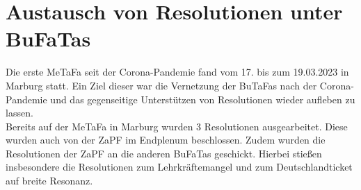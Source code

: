 \documentclass{scrartcl}
\begin{document}
\section*{Austausch von Resolutionen unter BuFaTas}
Die erste MeTaFa seit der Corona-Pandemie fand vom 17. bis zum 19.03.2023 in Marburg statt. Ein Ziel dieser war die Vernetzung der BuTaFas nach der Corona-Pandemie und das gegenseitige Unterstützen von Resolutionen wieder aufleben zu lassen.\\
Bereits auf der MeTaFa in Marburg wurden 3 Resolutionen ausgearbeitet. Diese wurden auch von der ZaPF im Endplenum beschlossen. Zudem wurden die Resolutionen der ZaPF an die anderen BuFaTas geschickt. Hierbei stießen insbesondere die Resolutionen zum Lehrkräftemangel und zum Deutschlandticket auf breite Resonanz.
\end{document}
